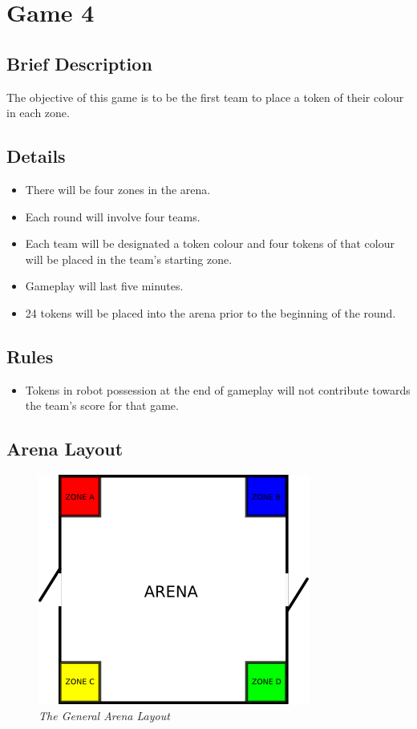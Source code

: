 \section {Game 4}

\subsection {Brief Description}

The objective of this game is to be the first team to place a token of their colour in each zone. 

\subsection {Details}

\begin {itemize}

\item There will be four zones in the arena.
\item Each round will involve four teams.
\item Each team will be designated a token colour and four tokens of that colour will be placed in the team's starting zone.
\item Gameplay will last five minutes.
\item 24 tokens will be placed into the arena prior to the beginning of the round.

\end {itemize}


\subsection {Rules}

\begin {itemize}
\item Tokens in robot possession at the end of gameplay will not contribute towards the team's score for that game.
\end {itemize}

\clearpage
\newpage

\subsection {Arena Layout}

\begin {figure}[h]
\begin {center}
\includegraphics[keepaspectratio, scale =1]{../arena/arenagame4.png}
\caption{\small{\emph{The General Arena Layout}}}
\label {fig:arena}
\end {center}
\end {figure}

